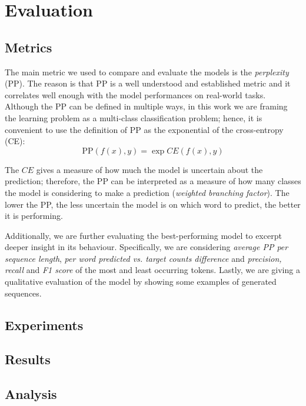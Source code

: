 
\section{Evaluation}
\label{sec:5_eval}
\subsection{Metrics}
The main metric we used to compare and evaluate the models is the \emph{perplexity} (PP). The reason is that PP is a well understood and established metric and it correlates well enough with the model performances on real-world tasks. Although the PP can be defined in multiple ways, in this work we are framing the learning problem as a multi-class classification problem; hence, it is convenient to use the definition of PP as the exponential of the cross-entropy (CE):
\begin{equation}
    \text{PP}(f(x), y) = \exp{CE(f(x), y)}
\end{equation}

The $CE$ gives a measure of how much the model is uncertain about the prediction; therefore, the PP can be interpreted as a measure of how many classes the model is considering to make a prediction (\emph{weighted branching factor}). The lower the PP, the less uncertain the model is on which word to predict, the better it is performing.

Additionally, we are further evaluating the best-performing model to excerpt deeper insight in its behaviour. Specifically, we are considering \emph{average PP per sequence length}, \emph{per word predicted vs. target counts difference} and \emph{precision, recall} and \emph{F1 score} of the most and least occurring tokens. Lastly, we are giving a qualitative evaluation of the model by showing some examples of generated sequences.

\subsection{Experiments}
\subsection{Results}
\subsection{Analysis}
